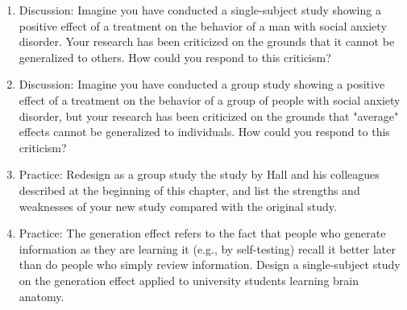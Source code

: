 \begin{fullwidth} 
\begin{enumerate}

\item Discussion: Imagine you have conducted a single-subject study showing a positive effect of a treatment on the behavior of a man with social anxiety disorder. Your research has been criticized on the grounds that it cannot be generalized to others. How could you respond to this criticism?
\item Discussion: Imagine you have conducted a group study showing a positive effect of a treatment on the behavior of a group of people with social anxiety disorder, but your research has been criticized on the grounds that "average" effects cannot be generalized to individuals. How could you respond to this criticism?
\item  Practice: Redesign as a group study the study by Hall and his colleagues described at the beginning of this chapter, and list the strengths and weaknesses of your new study compared with the original study.
\item Practice: The generation effect refers to the fact that people who generate information as they are learning it (e.g., by self-testing) recall it better later than do people who simply review information. Design a single-subject study on the generation effect applied to university students learning brain anatomy.
\end{enumerate}
\end{fullwidth}  
